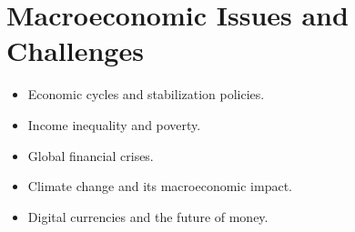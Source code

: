 \section{Macroeconomic Issues and Challenges}
\begin{itemize}
    \item Economic cycles and stabilization policies.
    \item Income inequality and poverty.
    \item Global financial crises.
    \item Climate change and its macroeconomic impact.
    \item Digital currencies and the future of money.
\end{itemize}